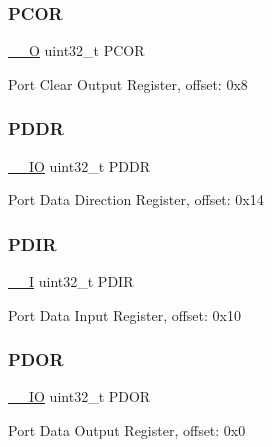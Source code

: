 \subsubsection{\texorpdfstring{PCOR}{PCOR}}
{\footnotesize\ttfamily \mbox{\hyperlink{core__cm0plus_8h_a7e25d9380f9ef903923964322e71f2f6}{\+\_\+\+\_\+O}} uint32\+\_\+t P\+C\+OR}

Port Clear Output Register, offset\+: 0x8 \mbox{\label{struct_g_p_i_o___type_a441a96d3febd01d841b24561b4d036a3}} 
\subsubsection{\texorpdfstring{PDDR}{PDDR}}
{\footnotesize\ttfamily \mbox{\hyperlink{core__cm0plus_8h_aec43007d9998a0a0e01faede4133d6be}{\+\_\+\+\_\+\+IO}} uint32\+\_\+t P\+D\+DR}

Port Data Direction Register, offset\+: 0x14 \mbox{\label{struct_g_p_i_o___type_a1013b95ac09a1205ba0528ad32ad1edc}} 
\subsubsection{\texorpdfstring{PDIR}{PDIR}}
{\footnotesize\ttfamily \mbox{\hyperlink{core__cm0plus_8h_af63697ed9952cc71e1225efe205f6cd3}{\+\_\+\+\_\+I}} uint32\+\_\+t P\+D\+IR}

Port Data Input Register, offset\+: 0x10 \mbox{\label{struct_g_p_i_o___type_aef77a53fb6962f329978c788b3c1e637}} 
\subsubsection{\texorpdfstring{PDOR}{PDOR}}
{\footnotesize\ttfamily \mbox{\hyperlink{core__cm0plus_8h_aec43007d9998a0a0e01faede4133d6be}{\+\_\+\+\_\+\+IO}} uint32\+\_\+t P\+D\+OR}

Port Data Output Register, offset\+: 0x0 \mbox{\label{struct_g_p_i_o___type_a3aa2323e3b596f8c9f191acb2ad7f75d}} 
